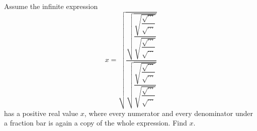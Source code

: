 Assume the infinite expression
\[
x=\sqrt{\dfrac{\sqrt{\dfrac{\sqrt{\dfrac{\sqrt{\cdots}}{\sqrt{\cdots}}}}{\sqrt{\dfrac{\sqrt{\cdots}}{\sqrt{\cdots}}}}}}{\sqrt{\dfrac{\sqrt{\dfrac{\sqrt{\cdots}}{\sqrt{\cdots}}}}{\sqrt{\dfrac{\sqrt{\cdots}}{\sqrt{\cdots}}}}}}}
\]
has a positive real value $x$, where every numerator and every denominator under a fraction bar is again a copy of the whole expression. Find $x$.
